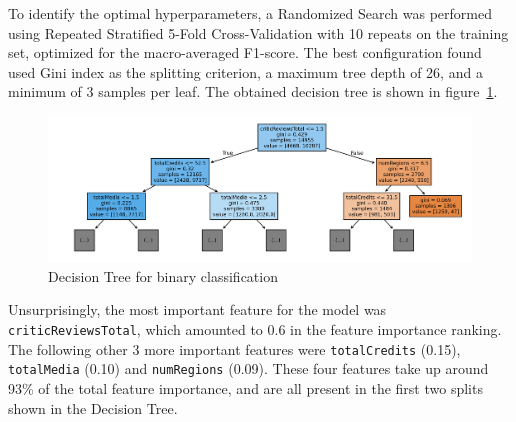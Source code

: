 To identify the optimal hyperparameters, a Randomized Search was performed
using Repeated Stratified 5-Fold Cross-Validation with 10 repeats on the training set, optimized for
the macro-averaged F1-score.
The best configuration found used Gini index as the splitting criterion,
a maximum tree depth of 26, and a minimum of 3 samples per leaf.
The obtained decision tree is shown in figure~\ref{fig:binary_dt}.
\begin{figure}[H]
    \centering
    \includegraphics[width=0.8\linewidth]{plots/binary_dt.png}
    \captionsetup{justification=centering, width=0.9\linewidth}
    \caption{Decision Tree for binary classification}
    \label{fig:binary_dt}
\end{figure}

Unsurprisingly, the most important feature for the model was \texttt{criticReviewsTotal},
which amounted to 0.6 in the feature importance ranking. The following other 3 more important
features were \texttt{totalCredits} (0.15), \texttt{totalMedia} (0.10) and \texttt{numRegions} (0.09).
These four features take up around 93\% of the total feature importance, and are all present in the first
two splits shown in the Decision Tree.\\

